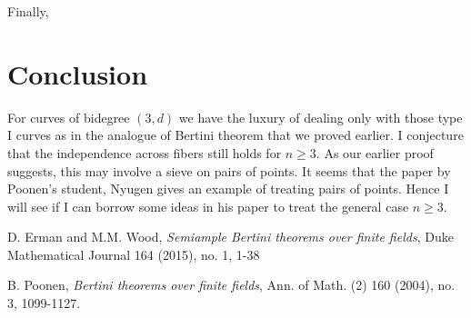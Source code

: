 \documentclass[12pt]{article}
\theoremstyle{plain}
\theoremstyle{definition}
\newcommand{\<}{\langle}
\renewcommand{\>}{\rangle}
\begin{document}
Finally,

\section{Conclusion}
For curves of bidegree $(3, d)$ we have the luxury of dealing only with those type I curves as in the analogue of Bertini theorem that we proved earlier. I conjecture that the independence across fibers still holds for $n \ge 3$. As our earlier proof suggests, this may involve a sieve on pairs of points. It seems that the paper by Poonen's student, Nyugen gives an example of treating pairs of points. Hence I will see if I can borrow some ideas in his paper to treat the general case $n \ge 3$. 

\begin{thebibliography}{9}
D. Erman and M.M. Wood, \textit{Semiample Bertini theorems over finite fields}, Duke Mathematical Journal 164 (2015), no. 1, 1-38

B. Poonen, \textit{Bertini theorems over finite fields}, Ann. of Math. (2) 160 (2004), no. 3, 1099-1127.
\end{thebibliography}
\end{document}
